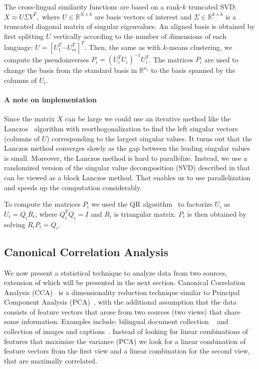 \documentclass[twoside,11pt]{article}
\newcommand{\RR}{\mathbb{R}}
\begin{document}
The cross-lingual similarity functions are based on a rank-$k$ truncated SVD: $X \approx U \Sigma V^T,$ where $U \in \RR^{N \times k}$ are basis vectors of interest and $\Sigma \in \RR^{k \times k}$ is a truncated diagonal matrix of singular eigenvalues. An aligned basis is obtained by first splitting $U$ vertically according to the number of dimensions of each language: $U = [U_1^T \cdots U_m^T]^T$. Then, the same as with $k$-means clustering, we compute the pseudoinverses $P_i = (U_i^T U_i)^{-1} U_i^T$. The matrices $P_i$ are used to change the basis from the standard basis in $\RR^{n_i}$ to the basis spanned by the columns of $U_i$.

\paragraph{A note on implementation}

  Since the matrix $X$ can be large we could use an iterative method like the Lanczos~\cite{golub} algorithm with reorthogonalization to find the left singular vectors (columns of $U$) corresponding to the largest singular values. It turns out that the Lanczos method converges slowly as the gap between the leading singular values is small. Moreover, the Lanczos method is hard to parallelize. Instead, we use a randomized version of the singular value decomposition (SVD) described in  that can be viewed as a block Lanczos method. That enables us to use parallelization and speeds up the computation considerably.

To compute the matrices $P_i$ we used the QR algorithm~\cite{golub} to factorize $U_i$ as $U_i = Q_i R_i$, where $Q_i^TQ_i = I$ and $R_i$ is triangular matrix. $P_i$ is then obtained by solving $R_i P_i = Q_i$.


\subsection{Canonical Correlation Analysis}\label{sec:CCA}
 We now present a statistical technique to analyze data from two sources, extension of which will be presented in the next section.
%
 Canonical Correlation Analysis (CCA)~\cite{Hotelling} is a dimensionality reduction technique similar to Principal Component Analysis (PCA)~\cite{Pearson1901On}, with the additional assumption that the data consists of feature vectors that arose from two sources (two views) that share some information. Examples include: bilingual document collection ~ and collection of images and captions~. Instead of looking for linear combinations of features that maximize the variance (PCA) we look for a linear combination of feature vectors from the first view and a linear combination for the second view, that are maximally correlated.
\end{document}
